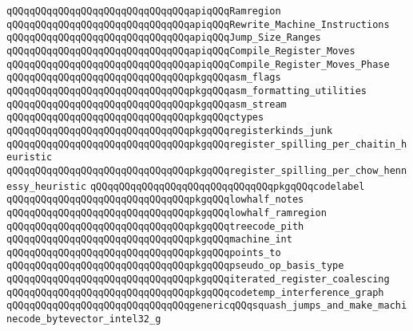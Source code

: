 \verb|qQQqqQQqqQQqqQQqqQQqqQQqqQQqqQQqapiqQQqRamregion|\newline
\verb|qQQqqQQqqQQqqQQqqQQqqQQqqQQqqQQqapiqQQqRewrite_Machine_Instructions|\newline
\verb|qQQqqQQqqQQqqQQqqQQqqQQqqQQqqQQqapiqQQqJump_Size_Ranges|\newline
\verb|qQQqqQQqqQQqqQQqqQQqqQQqqQQqqQQqapiqQQqCompile_Register_Moves|\newline
\verb|qQQqqQQqqQQqqQQqqQQqqQQqqQQqqQQqapiqQQqCompile_Register_Moves_Phase|\newline
\newline
\verb|qQQqqQQqqQQqqQQqqQQqqQQqqQQqqQQqpkgqQQqasm_flags|\newline
\verb|qQQqqQQqqQQqqQQqqQQqqQQqqQQqqQQqpkgqQQqasm_formatting_utilities|\newline
\verb|qQQqqQQqqQQqqQQqqQQqqQQqqQQqqQQqpkgqQQqasm_stream|\newline
\verb|qQQqqQQqqQQqqQQqqQQqqQQqqQQqqQQqpkgqQQqctypes|\newline
\verb|qQQqqQQqqQQqqQQqqQQqqQQqqQQqqQQqpkgqQQqregisterkinds_junk|\newline
\verb|qQQqqQQqqQQqqQQqqQQqqQQqqQQqqQQqpkgqQQqregister_spilling_per_chaitin_heuristic|\newline
\verb|qQQqqQQqqQQqqQQqqQQqqQQqqQQqqQQqpkgqQQqregister_spilling_per_chow_hennessy_heuristic|\newline
\verb|qQQqqQQqqQQqqQQqqQQqqQQqqQQqqQQqpkgqQQqcodelabel|\newline
\verb|qQQqqQQqqQQqqQQqqQQqqQQqqQQqqQQqpkgqQQqlowhalf_notes|\newline
\verb|qQQqqQQqqQQqqQQqqQQqqQQqqQQqqQQqpkgqQQqlowhalf_ramregion|\newline
\verb|qQQqqQQqqQQqqQQqqQQqqQQqqQQqqQQqpkgqQQqtreecode_pith|\newline
\verb|qQQqqQQqqQQqqQQqqQQqqQQqqQQqqQQqpkgqQQqmachine_int|\newline
\verb|qQQqqQQqqQQqqQQqqQQqqQQqqQQqqQQqpkgqQQqpoints_to|\newline
\verb|qQQqqQQqqQQqqQQqqQQqqQQqqQQqqQQqpkgqQQqpseudo_op_basis_type|\newline
\verb|qQQqqQQqqQQqqQQqqQQqqQQqqQQqqQQqpkgqQQqiterated_register_coalescing|\newline
\verb|qQQqqQQqqQQqqQQqqQQqqQQqqQQqqQQqpkgqQQqcodetemp_interference_graph|\newline
\newline
\verb|qQQqqQQqqQQqqQQqqQQqqQQqqQQqqQQqgenericqQQqsquash_jumps_and_make_machinecode_bytevector_intel32_g|\newline
